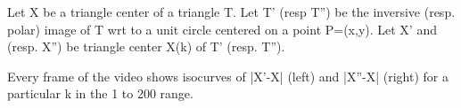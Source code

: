 Let X be a triangle center of a triangle T. Let T' (resp T'')  be the inversive  (resp. polar) image of T wrt to a unit circle centered on a point P=(x,y). Let X' and (resp. X'') be triangle center X(k) of T' (resp. T'').

Every frame of the video shows isocurves of |X'-X| (left) and |X''-X| (right) for a particular k in the 1 to 200 range.